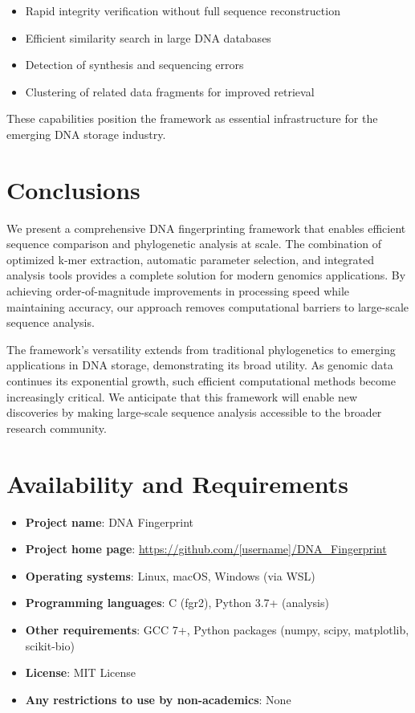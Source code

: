 \documentclass[12pt,a4paper]{article}
\begin{document}
\begin{itemize}
\item Rapid integrity verification without full sequence reconstruction
\item Efficient similarity search in large DNA databases
\item Detection of synthesis and sequencing errors
\item Clustering of related data fragments for improved retrieval
\end{itemize}

These capabilities position the framework as essential infrastructure for the emerging DNA storage industry.

\section{Conclusions}

We present a comprehensive DNA fingerprinting framework that enables efficient sequence comparison and phylogenetic analysis at scale. The combination of optimized k-mer extraction, automatic parameter selection, and integrated analysis tools provides a complete solution for modern genomics applications. By achieving order-of-magnitude improvements in processing speed while maintaining accuracy, our approach removes computational barriers to large-scale sequence analysis.

The framework's versatility extends from traditional phylogenetics to emerging applications in DNA storage, demonstrating its broad utility. As genomic data continues its exponential growth, such efficient computational methods become increasingly critical. We anticipate that this framework will enable new discoveries by making large-scale sequence analysis accessible to the broader research community.

\section{Availability and Requirements}

\begin{itemize}
\item \textbf{Project name}: DNA Fingerprint
\item \textbf{Project home page}: \url{https://github.com/[username]/DNA_Fingerprint}
\item \textbf{Operating systems}: Linux, macOS, Windows (via WSL)
\item \textbf{Programming languages}: C (fgr2), Python 3.7+ (analysis)
\item \textbf{Other requirements}: GCC 7+, Python packages (numpy, scipy, matplotlib, scikit-bio)
\item \textbf{License}: MIT License
\item \textbf{Any restrictions to use by non-academics}: None
\end{itemize}
\end{document}
